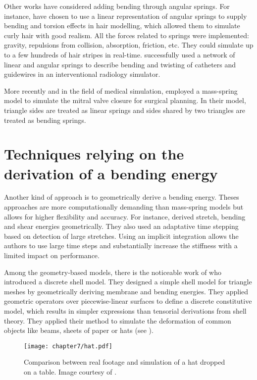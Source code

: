 Other works have considered adding bending through angular springs. For instance, \cite{Taskiran05} have chosen to use a linear representation of angular springs to supply bending and torsion effects in hair modelling, which allowed them to simulate curly hair with good realism. All the forces related to springs were implemented: gravity, repulsions from collision, absorption, friction, etc. They could simulate up to a few hundreds of hair stripes in real-time. \cite{Wang07} successfully used a network of linear and angular springs to describe bending and twisting of catheters and guidewires in an interventional radiology simulator. 

More recently and in the field of medical simulation, \cite{Hammer08} employed a mass-spring model to simulate the mitral valve closure for surgical planning. In their model, triangle sides are treated as linear springs and sides shared by two triangles are treated as bending springs. 

	
\section{Techniques relying on the derivation of a bending energy}

Another kind of approach is to geometrically derive a bending energy. Theses approaches are more computationally demanding than mass-spring models but allows for higher flexibility and accuracy. For instance, \cite{Baraff98} derived stretch, bending and shear energies geometrically. They also used an adaptative time stepping based on detection of large stretches. Using an implicit integration allows the authors to use large time steps and substantially increase the stiffness with a limited impact on performance. 

Among the geometry-based models, there is the noticeable work of \cite{Grinspun03} who introduced a discrete shell model. They designed a simple shell model for triangle meshes by geometrically deriving membrane and bending energies. They applied geometric operators over piecewise-linear surfaces to define a discrete constitutive model, which results in simpler expressions than tensorial derivations from shell theory. They applied their method to simulate the deformation of common objects like beams, sheets of paper or hats (see ). 
%
\begin{figure}[ht]
\begin{center}
\texttt{[image: chapter7/hat.pdf]}
\caption[Comparison between real footage and simulation of a hat dropped on a table]{Comparison between real footage and simulation of a hat dropped on a table. Image courtesy of \cite{Grinspun03}.}
\label{chap7:fig-hat}
\end{center}
\end{figure}

